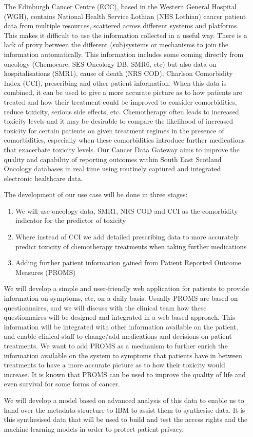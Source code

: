 The Edinburgh Cancer Centre (ECC), based in the Western General Hospital (WGH), contains National Health Service Lothian (NHS Lothian) cancer patient data from multiple resources, scattered across different systems and platforms. This makes it difficult to use the information collected in a useful way. There is a lack of proxy between the different (sub)systems or mechanisms to join the information automatically. This information includes some coming directly from oncology (Chemocare, SES Oncology DB, SMR6, etc) but also data on hospitalisations (SMR1), cause of death (NRS COD), Charlson Comorbidity Index (CCI), prescribing and other patient information. When this data is combined, it can be used to give a more accurate picture as to how patients are treated and how their treatment could be improved to consider comorbidities, reduce toxicity, serious side effects, etc. Chemotherapy often leads to increased toxicity levels and it may be desirable to compare the likelihood of increased toxicity for certain patients on given treatment regimes in the presence of comorbidities, especially when these comorbidities introduce further medications that exacerbate toxicity levels. Our Cancer Data Gateway aims to improve the quality and capability of reporting outcomes within South East Scotland Oncology databases in real time using routinely captured and integrated electronic healthcare data.


The development of our use case will be done in three stages:
\begin{enumerate}
    \item We will use oncology data, SMR1, NRS COD and CCI as the comorbidity indicator for the predictor of toxicity
    \item Where instead of CCI we add detailed prescribing data to more accurately predict toxicity of chemotherapy treatments when taking further medications
    \item Adding further patient information gained from Patient Reported Outcome Measures (PROMS)
\end{enumerate}
We will develop a simple and user-friendly web application for patients to provide information on symptoms, etc, on a daily basis. Usually PROMS are based on questionnaires, and we will discuss with the clinical team how these questionnaires will be designed and integrated in a web-based approach. This information will be integrated with other information available on the patient, and enable clinical staff to change/add medications and decisions on patient treatments. We want to add PROMS as a mechanism to further enrich the information available on the system to symptoms that patients have in between treatments to have a more accurate picture as to how their toxicity would increase. It is known that PROMS can be used to improve the quality of life and even survival for some forms of cancer.

We will develop a model based on advanced analysis of this data to enable us to hand over the metadata structure to IBM to assist them to synthesise data. It is this synthesised data that will be used to build and test the access rights and the machine learning models in order to protect patient privacy. 